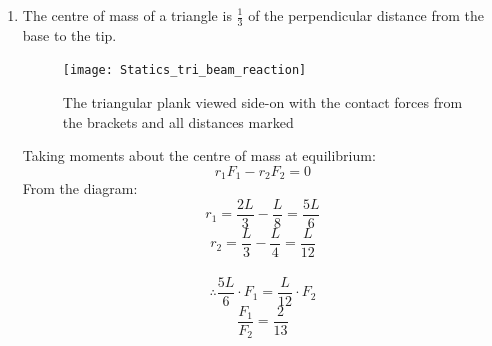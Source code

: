 \begin{hint}[AO1989PIQ3a]
{\begin{enumerate}
Considering moments about the centre of mass at equilibrium:
\begin{equation*}
r_1F_1-r_2F_2=0
\end{equation*}
From the diagram:
\begin{equation*}
r_1=\frac{L}{2}-\frac{L}{8}=\frac{3L}{8} 
\end{equation*}
\begin{equation*}
r_2=\frac{L}{2}-\frac{L}{4}=\frac{L}{4} 
\end{equation*}
\\
\begin{equation*}
\therefore \frac{3L}{8} \cdot F_1 = \frac{L}{4} \cdot F_2 
\end{equation*}
\begin{equation*} 
\frac{F_1}{F_2}=\frac{2}{3}
\end{equation*}
\\

	\item The centre of mass of a triangle is $\frac{1}{3}$ of the perpendicular distance from the base to the tip.
\begin{figure}[htbp]
	\centering
	\texttt{[image: Statics\_tri\_beam\_reaction]}
	\caption{The triangular plank viewed side-on with the contact forces from the brackets and all distances marked}
	\label{fig:Statics_tri_beam_reaction}
\end{figure}

Taking moments about the centre of mass at equilibrium:
\begin{equation*}
r_1F_1-r_2F_2=0
\end{equation*}
From the diagram:
\begin{equation*}
r_1=\frac{2L}{3}-\frac{L}{8}=\frac{5L}{6} 
\end{equation*}
\begin{equation*}
r_2=\frac{L}{3}-\frac{L}{4}=\frac{L}{12} 
\end{equation*}
\\
\begin{equation*}
\therefore \frac{5L}{6} \cdot F_1 = \frac{L}{12} \cdot F_2 
\end{equation*}
\begin{equation*} 
\frac{F_1}{F_2}=\frac{2}{13}
\end{equation*}


\end{enumerate}
}
\end{hint}
